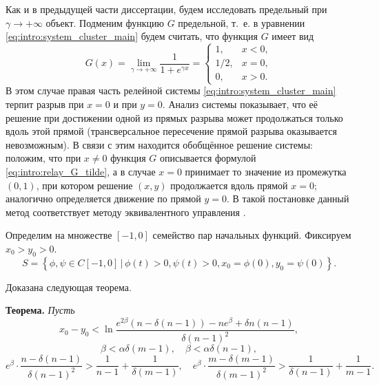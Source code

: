 Как и в предыдущей части диссертации, будем исследовать предельный при $\gamma \to +\infty$ объект. Подменим функцию $G$ предельной, т.~е. в уравнении \eqref{eq:intro:system_cluster_main} будем считать, что функция $G$ имеет вид 
\begin{equation}
	\label{eq:intro:relay_G_tilde}
	G(x) = \lim\limits_{\gamma \to +\infty} \dfrac{1}{1 + e^{\gamma x}} = 
	\begin{cases}
		1, & x < 0,\\
		1/2, & x = 0,\\
		0, & x > 0.
	\end{cases}
\end{equation}
%
В этом случае правая часть релейной системы \eqref{eq:intro:system_cluster_main} терпит разрыв при $x = 0$ и при $y = 0$. Анализ системы показывает, что её решение при достижении одной из прямых разрыва может продолжаться только вдоль этой прямой (трансверсальное пересечение прямой разрыва оказывается невозможным). В связи с этим находится обобщённое решение системы: положим, что при $x \neq 0$ функция $G$ описывается формулой \eqref{eq:intro:relay_G_tilde}, а в случае $x = 0$ принимает то значение из промежутка $(0, 1)$, при котором решение $(x, y)$ продолжается вдоль прямой $x = 0$; аналогично определяется движение по прямой $y = 0$. В такой постановке данный метод соответствует методу эквивалентного управления \cite{Utkin1981}. %


Определим на множестве $[-1, 0]$ семейство пар начальных функций. Фиксируем $x_0 > y_0 > 0$.
\begin{equation}
	\label{eq:intro:initial_set}
	S = \left\{\phi, \psi \in C[-1, 0] \,|\, \phi(t) > 0, \psi(t) > 0, x_0 = \phi(0), y_0 = \psi(0)\right\}.
\end{equation}

Доказана следующая теорема.

\bigskip

\textbf{Теорема.}
\textit{Пусть}
%
\begin{equation}
	\label{eq:intro:constraint_1}
	x_0 - y_0 < \ln \dfrac{e^{2\beta}(n - \delta(n - 1)) - ne^{\beta} + \delta n(n - 1)}{\delta (n - 1)^2},
\end{equation}
\begin{equation}
	\label{eq:intro:constraint_2}
	\beta < \alpha \delta (m - 1), \quad \beta < \alpha \delta (n - 1),
\end{equation}
\small
\begin{equation}
	\label{eq:intro:constraint_3}
	e^{\beta} \cdot \dfrac{n - \delta(n - 1)}{\delta (n - 1)^2} > \dfrac{1}{n - 1} + \dfrac{1}{\delta(m - 1)}, \quad
	e^{\beta} \cdot \dfrac{m - \delta(m - 1)}{\delta (m - 1)^2} > \dfrac{1}{\delta(n - 1)} + \dfrac{1}{m - 1}.
\end{equation}
\normalsize

